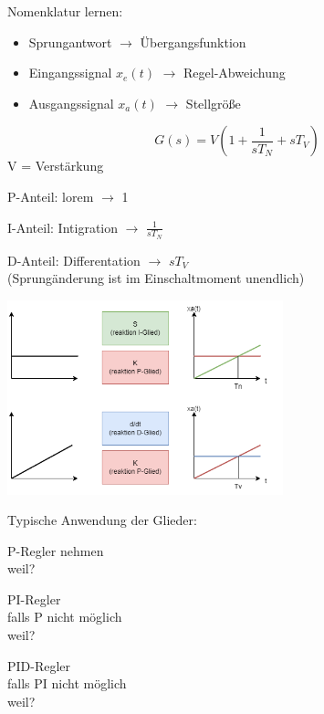 \documentclass{article}
\begin{document}
Nomenklatur lernen: 
\begin{itemize}
	\item Sprungantwort $\rightarrow$ Übergangsfunktion
	\item Eingangssignal $x_e(t)$ $\rightarrow$ Regel-Abweichung
	\item Ausgangssignal $x_a(t)$ $\rightarrow$ Stellgröße
\end{itemize}

\[
G(s) = V(1+ \frac{1}{sT_N}+ sT_V)
\]
V = Verstärkung
\begin{multicols}{3}
	P-Anteil: lorem $\rightarrow$  1

	\columnbreak
	I-Anteil: Intigration $\rightarrow$ $\frac{1}{sT_N}$

	\columnbreak
	D-Anteil: Differentation $\rightarrow$ $sT_V$ \\
	(Sprungänderung ist im Einschaltmoment unendlich)
\end{multicols}
\begin{center}
	\includegraphics[width=0.6\textwidth]{19_11_2024_reglungstechnik.png}
\end{center}

Typische Anwendung der Glieder: 
\begin{multicols}{3}
	P-Regler nehmen \\
	weil?

	\columnbreak
	PI-Regler \\
	falls P nicht möglich \\
	weil?

	\columnbreak
	PID-Regler \\
	falls PI nicht möglich \\
	weil?
\end{multicols}
\end{document}
